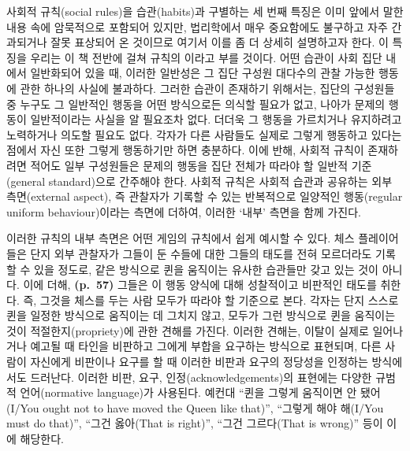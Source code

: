 사회적 규칙(social rules)을 습관(habits)과 구별하는 세 번째 특징은 이미
앞에서 말한 내용 속에 암묵적으로 포함되어 있지만, 법리학에서 매우
중요함에도 불구하고 자주 간과되거나 잘못 표상되어 온 것이므로 여기서
이를 좀 더 상세히 설명하고자 한다. 이 특징을 우리는 이 책 전반에 걸쳐
규칙의 이라고 부를 것이다. 어떤 습관이
사회 집단 내에서 일반화되어 있을 때, 이러한 일반성은 그 집단 구성원
대다수의 관찰 가능한 행동에 관한 하나의 사실에 불과하다. 그러한 습관이
존재하기 위해서는, 집단의 구성원들 중 누구도 그 일반적인 행동을 어떤
방식으로든 의식할 필요가 없고, 나아가 문제의 행동이 일반적이라는 사실을
알 필요조차 없다. 더더욱 그 행동을 가르치거나 유지하려고 노력하거나
의도할 필요도 없다. 각자가 다른 사람들도 실제로 그렇게 행동하고 있다는
점에서 자신 또한 그렇게 행동하기만 하면 충분하다. 이에 반해, 사회적
규칙이 존재하려면 적어도 일부 구성원들은 문제의 행동을 집단 전체가
따라야 할 일반적 기준(general standard)으로 간주해야 한다. 사회적 규칙은
사회적 습관과 공유하는 외부 측면(external aspect), 즉 관찰자가 기록할 수
있는 반복적으로 일양적인 행동(regular uniform behaviour)이라는 측면에
더하여, 이러한 ‘내부’ 측면을 함께 가진다.

이러한 규칙의 내부 측면은 어떤 게임의 규칙에서 쉽게 예시할 수 있다. 체스
플레이어들은 단지 외부 관찰자가 그들이 둔 수들에 대한 그들의 태도를 전혀
모르더라도 기록할 수 있을 정도로, 같은 방식으로 퀸을 움직이는 유사한
습관들만 갖고 있는 것이 아니다. 이에 더해, \textbf{(p.~57)} 그들은 이
행동 양식에 대해 성찰적이고 비판적인 태도를 취한다. 즉, 그것을 체스를
두는 사람 모두가 따라야 할 기준으로 본다. 각자는 단지 스스로 퀸을 일정한
방식으로 움직이는 데 그치지 않고, 모두가 그런 방식으로 퀸을 움직이는
것이 적절한지(propriety)에 관한 견해를 가진다. 이러한 견해는, 이탈이
실제로 일어나거나 예고될 때 타인을 비판하고 그에게 부합을 요구하는
방식으로 표현되며, 다른 사람이 자신에게 비판이나 요구를 할 때 이러한
비판과 요구의 정당성을 인정하는 방식에서도 드러난다. 이러한 비판, 요구,
인정(acknowledgements)의 표현에는 다양한 규범적 언어(normative
language)가 사용된다. 예컨대 “퀸을 그렇게 움직이면 안 됐어(I/You ought
not to have moved the Queen like that)”, “그렇게 해야 해(I/You must do
that)”, “그건 옳아(That is right)”, “그건 그르다(That is wrong)”
등이 이에 해당한다.

